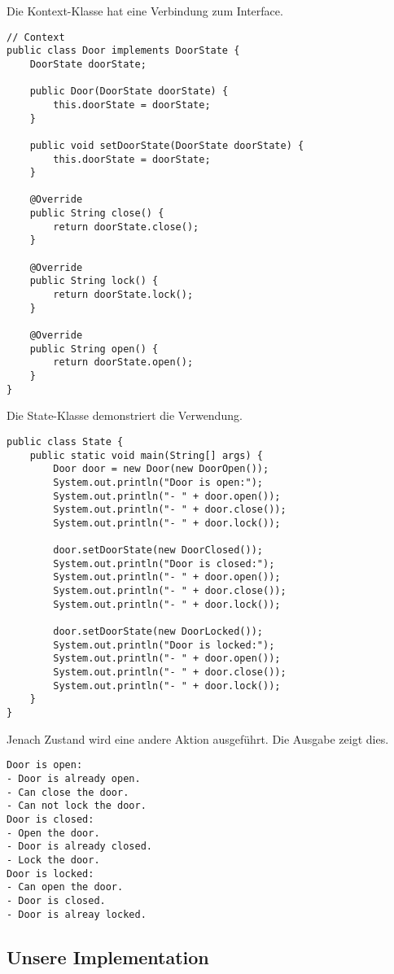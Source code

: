 \documentclass[10pt,a4paper]{article}
\begin{document}
%
Die Kontext-Klasse hat eine Verbindung zum Interface.
%
\begin{lstlisting}[caption={Context}]
// Context
public class Door implements DoorState {
	DoorState doorState;

	public Door(DoorState doorState) {
		this.doorState = doorState;
	}

	public void setDoorState(DoorState doorState) {
		this.doorState = doorState;
	}
	
	@Override
	public String close() {
		return doorState.close();
	}

	@Override
	public String lock() {
		return doorState.lock();
	}

	@Override
	public String open() {
		return doorState.open();
	}
}
\end{lstlisting}
%
Die State-Klasse demonstriert die Verwendung.
%
\begin{lstlisting}[caption={State-Klasse}]
public class State {
	public static void main(String[] args) {
		Door door = new Door(new DoorOpen());
		System.out.println("Door is open:");
		System.out.println("- " + door.open());
		System.out.println("- " + door.close());
		System.out.println("- " + door.lock());
		
		door.setDoorState(new DoorClosed());
		System.out.println("Door is closed:");
		System.out.println("- " + door.open());
		System.out.println("- " + door.close());
		System.out.println("- " + door.lock());

		door.setDoorState(new DoorLocked());
		System.out.println("Door is locked:");
		System.out.println("- " + door.open());
		System.out.println("- " + door.close());
		System.out.println("- " + door.lock());
	}
}
\end{lstlisting}
%
Jenach Zustand wird eine andere Aktion ausgeführt. Die Ausgabe zeigt dies.
%
\begin{lstlisting}[caption={Output}]
Door is open:
- Door is already open.
- Can close the door.
- Can not lock the door.
Door is closed:
- Open the door.
- Door is already closed.
- Lock the door.
Door is locked:
- Can open the door. 
- Door is closed.
- Door is alreay locked.
\end{lstlisting}
%
\subsection*{Unsere Implementation}
%

%
\end{document}
